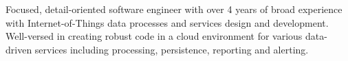

\begin{cvparagraph}
    Focused, detail-oriented software engineer with over 4 years of broad experience with Internet-of-Things data processes and services design and development.
    Well-versed in creating robust code in a cloud environment for various data-driven services including processing, persistence, reporting and alerting.
\end{cvparagraph}